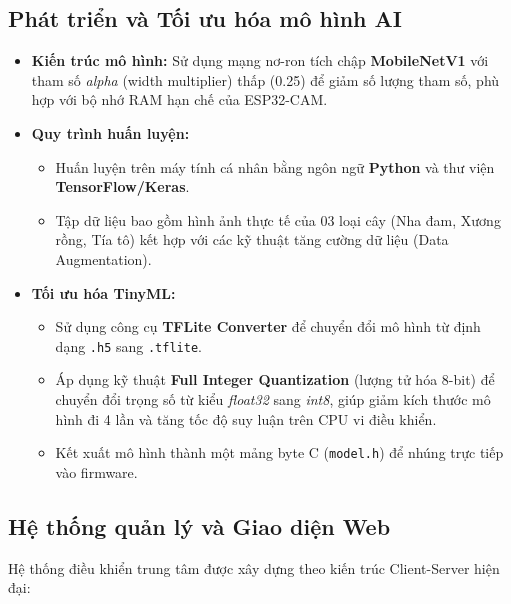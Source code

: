 \documentclass[12pt,a4paper]{report}
\begin{document}
\subsection{Phát triển và Tối ưu hóa mô hình AI}


\begin{itemize}
    \item \textbf{Kiến trúc mô hình:} Sử dụng mạng nơ-ron tích chập \textbf{MobileNetV1} với tham số \textit{alpha} (width multiplier) thấp (0.25) để giảm số lượng tham số, phù hợp với bộ nhớ RAM hạn chế của ESP32-CAM.
    \item \textbf{Quy trình huấn luyện:} 
    \begin{itemize}
        \item Huấn luyện trên máy tính cá nhân bằng ngôn ngữ \textbf{Python} và thư viện \textbf{TensorFlow/Keras}.
        \item Tập dữ liệu bao gồm hình ảnh thực tế của 03 loại cây (Nha đam, Xương rồng, Tía tô) kết hợp với các kỹ thuật tăng cường dữ liệu (Data Augmentation).
    \end{itemize}
    \item \textbf{Tối ưu hóa TinyML:} 
    \begin{itemize}
        \item Sử dụng công cụ \textbf{TFLite Converter} để chuyển đổi mô hình từ định dạng \texttt{.h5} sang \texttt{.tflite}.
        \item Áp dụng kỹ thuật \textbf{Full Integer Quantization} (lượng tử hóa 8-bit) để chuyển đổi trọng số từ kiểu \textit{float32} sang \textit{int8}, giúp giảm kích thước mô hình đi 4 lần và tăng tốc độ suy luận trên CPU vi điều khiển.
        \item Kết xuất mô hình thành một mảng byte C (\texttt{model.h}) để nhúng trực tiếp vào firmware.
    \end{itemize}
\end{itemize}

\subsection{Hệ thống quản lý và Giao diện Web}

Hệ thống điều khiển trung tâm được xây dựng theo kiến trúc Client-Server hiện đại:
\end{document}
